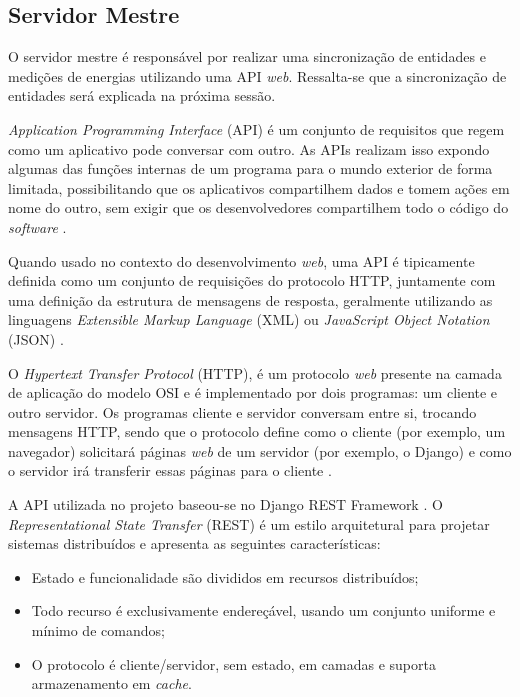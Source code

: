 \subsection{Servidor Mestre}
O servidor mestre é responsável por realizar uma sincronização de entidades e medições de energias utilizando uma API \textit{web}. Ressalta-se que a sincronização de entidades será explicada na próxima sessão.

\textit{Application Programming Interface} (API) é um conjunto de requisitos que regem como um aplicativo pode conversar com outro. As APIs realizam isso expondo algumas das funções internas de um programa para o mundo exterior de forma limitada, possibilitando que os aplicativos compartilhem dados e tomem ações em nome do outro, sem exigir que os desenvolvedores compartilhem todo o código do \textit{software} \cite{brian_api}.

Quando usado no contexto do desenvolvimento \textit{web}, uma API é tipicamente definida como um conjunto de requisições do protocolo HTTP, juntamente com uma definição da estrutura de mensagens de resposta, geralmente utilizando as linguagens \textit{Extensible Markup Language} (XML) ou \textit{JavaScript Object Notation} (JSON) \cite{benslimane_2008}.

O \textit{Hypertext Transfer Protocol} (HTTP), é um protocolo \textit{web} presente na camada de aplicação do modelo OSI e é implementado por dois programas: um cliente e outro servidor. Os programas cliente e servidor conversam entre si, trocando mensagens HTTP, sendo que o protocolo define como o cliente (por exemplo, um navegador) solicitará páginas \textit{web} de um servidor (por exemplo, o Django) e como o servidor irá transferir essas páginas para o cliente \cite{kurose_2002}.

A API utilizada no projeto baseou-se no Django REST Framework \cite{django_rest}. O \textit{Representational State Transfer} (REST) \cite{fielding_2000} é um estilo arquitetural para projetar sistemas distribuídos e apresenta as seguintes características:

\begin{itemize}
    \item Estado e funcionalidade são divididos em recursos distribuídos;
    \item Todo recurso é exclusivamente endereçável, usando um conjunto uniforme e mínimo de comandos;
    \item O protocolo é cliente/servidor, sem estado, em camadas e suporta armazenamento em \textit{cache}.
\end{itemize}

